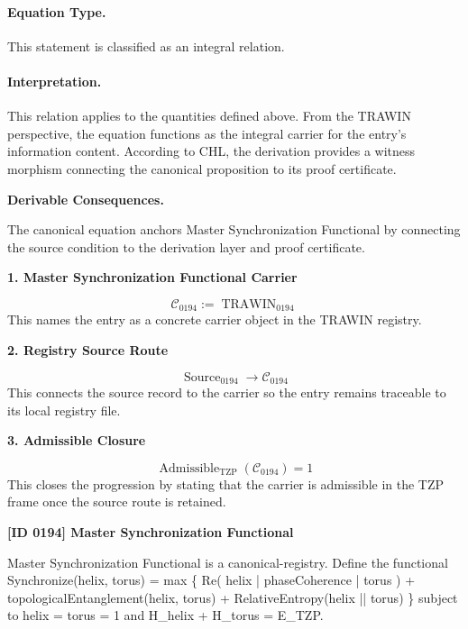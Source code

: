 \paragraph{Equation Type.}
This statement is classified as an integral relation.

\paragraph{Interpretation.}
This relation applies to the quantities defined above. From the TRAWIN perspective, the equation functions as the integral carrier for the entry’s information content. According to CHL, the derivation provides a witness morphism connecting the canonical proposition to its proof certificate.

\par\vspace{0.35em}
\noindent\textbf{Derivable Consequences.}\quad
\begingroup
\footnotesize
\raggedright
The canonical equation anchors Master Synchronization Functional by connecting the source condition to the derivation layer and proof certificate.
\par\endgroup

\noindent\textbf{1. Master Synchronization Functional Carrier}\par
\[
\mathcal{C}_{0194} := \operatorname{TRAWIN}_{0194}
\]
\noindent This names the entry as a concrete carrier object in the TRAWIN registry.\par
\noindent\textbf{2. Registry Source Route}\par
\[
\operatorname{Source}_{0194}\longrightarrow \mathcal{C}_{0194}
\]
\noindent This connects the source record to the carrier so the entry remains traceable to its local registry file.\par
\noindent\textbf{3. Admissible Closure}\par
\[
\operatorname{Admissible}_{\mathrm{TZP}}\!\left(\mathcal{C}_{0194}\right)=1
\]
\noindent This closes the progression by stating that the carrier is admissible in the TZP frame once the source route is retained.\par

\clearpage
\noindent\textbf{[ID 0194] Master Synchronization Functional}\par
\vspace{0.35em}
\begingroup\small
{}
Master Synchronization Functional is a canonical-registry. Define the functional Synchronize(helix, torus) = max \{ Re( helix | phaseCoherence | torus ) + topologicalEntanglement(helix, torus) + RelativeEntropy(helix || torus) \} subject to  helix  =  torus  = 1 and H\_helix + H\_torus = E\_TZP.

